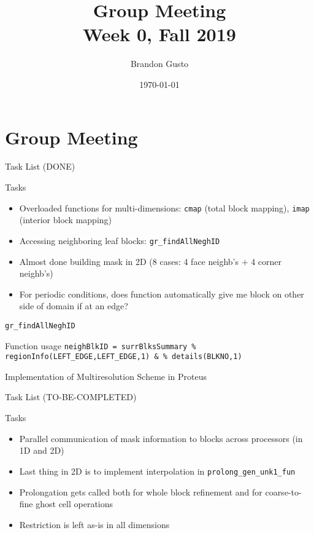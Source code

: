 \documentclass{beamer}
\newcommand{\weeknum}{0}
\begin{document}
  \section{Group Meeting}
  \title{Group Meeting \\ Week \weeknum, Fall 2019}
  \author{Brandon Gusto}

  \date{\today}
  \frame{\titlepage}

  \begin{frame}{Task List (DONE)}
    \begin{block}{Tasks}
      \begin{itemize}
        \setlength\itemsep{1em}
        \item Overloaded functions for multi-dimensions: \texttt{cmap} (total block mapping), \texttt{imap} (interior block mapping)
        \item Accessing neighboring leaf blocks: \texttt{gr\_findAllNeghID}
        \item Almost done building mask in 2D (8 cases: 4 face neighb's $+$ 4 corner neighb's)
        \item For periodic conditions, does function automatically give me block on other side of domain if at an edge?
      \end{itemize}
    \end{block}
  \end{frame}

  \begin{frame}{\texttt{gr\_findAllNeghID}}
    \begin{block}{Function usage}
      \texttt{neighBlkID = surrBlksSummary \% regionInfo(LEFT\_EDGE,LEFT\_EDGE,1) \& \% details(BLKNO,1)}
    \end{block}
  \end{frame}

  \begin{frame}{Implementation of Multiresolution Scheme in Proteus}
    \begin{figure}
      
    \end{figure}
  \end{frame}

  \begin{frame}{Task List (TO-BE-COMPLETED)}
    \begin{block}{Tasks}
      \begin{itemize}
        \setlength\itemsep{1em}
        \item Parallel communication of mask information to blocks across processors (in 1D and 2D)
        \item Last thing in 2D is to implement interpolation in \texttt{prolong\_gen\_unk1\_fun}
        \item Prolongation gets called both for whole block refinement and for coarse-to-fine ghost cell operations
        \item Restriction is left as-is in all dimensions
      \end{itemize}
    \end{block}
  \end{frame}
\end{document}
